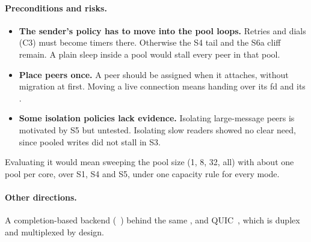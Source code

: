 \paragraph{Preconditions and risks.}
\begin{itemize}
  \item \textbf{The sender's policy has to move into the pool loops.} Retries and
        dials (C3) must become timers there. Otherwise the S4 tail and the S6a cliff
        remain. A plain sleep inside a pool would stall every peer in that pool.
  \item \textbf{Place peers once.} A peer should be assigned when it attaches, without
        migration at first. Moving a live connection means handing over its fd and
        its .
  \item \textbf{Some isolation policies lack evidence.} Isolating large-message peers
        is motivated by S5 but untested. Isolating slow readers showed no clear need,
        since pooled writes did not stall in S3.
\end{itemize}
Evaluating it would mean sweeping the pool size (1, 8, 32, all) with about one pool
per core, over S1, S4 and S5, under one capacity rule for every mode.

\paragraph{Other directions.} A completion-based backend
(~\cite{iouring}) behind the same , and QUIC~\cite{quic},
which is duplex and multiplexed by design.
